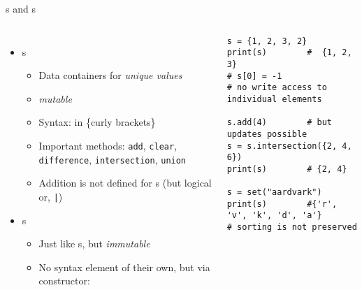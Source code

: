 \begin{frame}[fragile]{s and s}
%
\begin{columns}[T]
\begin{itemize}
\item {}s
	\begin{itemize}
	\item Data containers for \emph{unique values}
	\item \emph{mutable}
	\item Syntax: in \{curly brackets\}
	\item Important methods: \texttt{add}, \texttt{clear}, \texttt{difference}, \texttt{intersection}, \texttt{union}
	\item Addition is not defined for s (but logical or, \texttt{|})
	\end{itemize}
\item {}s
	\begin{itemize}
	\item Just like s, but \emph{immutable}
	\item No syntax element of their own, but via constructor: 
	\end{itemize}
\end{itemize}
%
\begin{codebox}
\begin{verbatim}
s = {1, 2, 3, 2}
print(s)        #  {1, 2, 3}
# s[0] = -1     
# no write access to individual elements

s.add(4)        # but updates possible
s = s.intersection({2, 4, 6})
print(s)        # {2, 4}

s = set("aardvark")
print(s)        #{'r', 'v', 'k', 'd', 'a'}
# sorting is not preserved
\end{verbatim}
\end{codebox}
\end{columns}
%
\end{frame}


